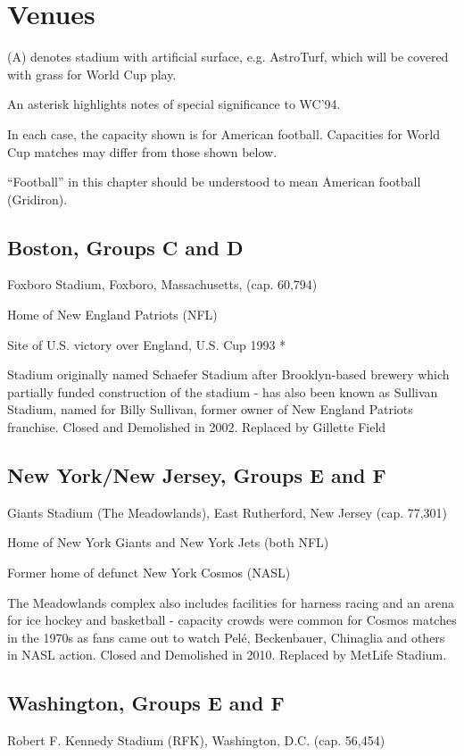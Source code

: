 \chapter{Venues}
\newline
\newline
(A) denotes stadium with artificial surface, e.g. AstroTurf, which will be
covered with grass for World Cup play.

An asterisk highlights notes of special significance to WC'94.

In each case, the capacity shown is for American football. Capacities for World
Cup matches may differ from those shown below.

``Football'' in this chapter should be understood to mean American football (Gridiron).

\section{Boston, Groups C and D}
Foxboro Stadium, Foxboro, Massachusetts, (cap. 60,794)

Home of New England Patriots (NFL)

Site of U.S. victory over England, U.S. Cup 1993 *

Stadium originally named Schaefer Stadium after Brooklyn-based brewery which 
partially funded construction of the stadium - has also been known as Sullivan
Stadium, named for Billy Sullivan, former owner of New England Patriots 
franchise.  Closed and Demolished in 2002.   Replaced by Gillette Field
\section{New York/New Jersey, Groups E and F}
Giants Stadium (The Meadowlands), East Rutherford, New Jersey (cap. 77,301)

Home of New York Giants and New York Jets (both NFL)

Former home of defunct New York Cosmos (NASL)

The Meadowlands complex also includes facilities for harness racing and an 
arena for ice hockey and basketball - capacity crowds were common for Cosmos 
matches in the 1970s as fans came out to watch Pel{\'e}, Beckenbauer, Chinaglia and
others in NASL action.  Closed and Demolished in 2010.  Replaced by MetLife Stadium.
\section{Washington, Groups E and F}
Robert F. Kennedy Stadium (RFK), Washington, D.C. (cap. 56,454)

